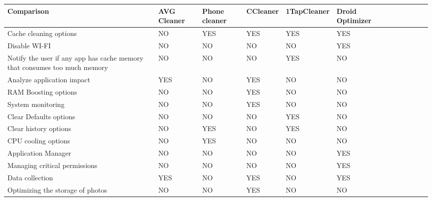     \begin{center}
    \begin{tabular}{ | >{\centering\arraybackslash}X m{3cm} | >{\centering\arraybackslash}X m{1.8cm} | >{\centering\arraybackslash}X m{1.8cm} | >{\centering\arraybackslash}X m{1.8cm} | >{\centering\arraybackslash}X m{2.2cm} | >{\centering\arraybackslash}X m{2cm} | }
    \hline
        \textbf{Comparison} & \textbf{AVG Cleaner} & \textbf{Phone cleaner} & \textbf{CCleaner} & \textbf{1TapCleaner} & \textbf{Droid Optimizer} \\ \hline

        Cache cleaning options & NO & YES & YES & YES & YES \\ \hline

        Disable WI-FI & NO & NO & NO & NO & YES \\ \hline

        Notify the user if any app has cache memory that consumes too much memory & NO & NO & NO & YES & NO \\ \hline

        Analyze application impact & YES & NO & YES & NO & NO \\ \hline
        
        RAM Boosting options & NO & NO & YES & NO & NO \\ \hline

        System monitoring & NO & NO & YES & NO & NO \\ \hline

        Clear Defaults options & NO & NO & NO & YES & NO \\ \hline

        Clear history options & NO & YES & NO & YES & NO \\ \hline

        CPU cooling options & NO & YES & NO & NO & NO \\ \hline
        
        Application Manager & NO & NO & NO & NO & YES \\ \hline
        
        Managing critical permissions & NO & NO & NO & NO & YES \\ \hline
        
        Data collection & YES & NO & YES & NO & YES \\ \hline
        
        Optimizing the storage of photos & NO & NO & YES & NO & NO \\ \hline
        

\end{tabular}
\end{center}

